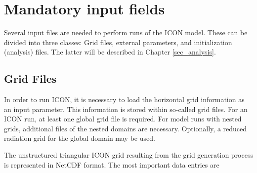 \chapter{Mandatory input fields}

Several input files are needed to perform runs of the ICON model. 
%
These can be divided into three classes:
%
Grid files, external parameters, and initialization (analysis) files. The latter 
will be described in Chapter \ref{sec_analysis}.


\section{Grid Files}
\label{section:grid_files}

In order to run ICON, it is necessary to load the horizontal grid
information as an input para\-meter. 
This information is stored within so-called grid files. For an ICON 
run, at least one global grid file is required.
For model runs with nested grids, additional files of the nested
domains are necessary. Optionally, a reduced radiation grid for
the global domain may be used.

%
The unstructured triangular ICON grid resulting from the grid
generation process is represented in NetCDF format.  The most
important data entries are

